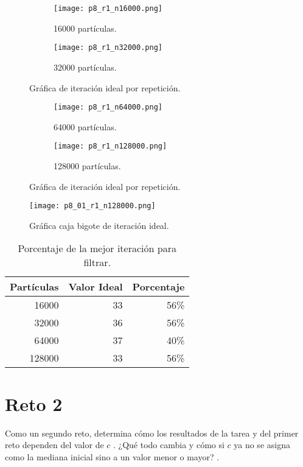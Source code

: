 \documentclass{article}
\begin{document}
\begin{figure}[H]
\centering
\begin{subfigure}[b]{0.40\linewidth}
\texttt{[image: p8\_r1\_n16000.png]}
\caption{16000 partículas.}
\end{subfigure}
\begin{subfigure}[b]{0.40\linewidth}
\texttt{[image: p8\_r1\_n32000.png]}
\caption{32000 partículas.}
\end{subfigure}
\caption{Gráfica de iteración ideal por repetición.}
\label{fig:westminster}
\end{figure}

\begin{figure}[H]
\centering
\begin{subfigure}[b]{0.40\linewidth}
\texttt{[image: p8\_r1\_n64000.png]}
\caption{64000 partículas.}
\end{subfigure}
\begin{subfigure}[b]{0.40\linewidth}
\texttt{[image: p8\_r1\_n128000.png]}
\caption{128000 partículas.}
\end{subfigure}
\caption{Gráfica de iteración ideal por repetición.}
\label{fig:westminster}
\end{figure}

\begin{figure}[H]
\centering
\texttt{[image: p8\_01\_r1\_n128000.png]}
\caption{\label{fig3} Gráfica caja bigote de iteración ideal.}
\end{figure}

\begin{table}[h!]
\centering
\caption{Porcentaje de la mejor iteración para filtrar.}
 \begin{tabular}{||r r r||} 
 \hline
 Partículas & Valor Ideal & Porcentaje  \\ [0.5ex] 
 \hline\hline
 16000 & 33 & 56\% \\
 \hline
 32000 & 36 & 56\%\\ 
 \hline
 64000 & 37 & 40\%  \\
 \hline
 128000 & 33 & 56\% \\
 \hline
\end{tabular}
\label{table:1}
\end{table}

\section{Reto 2}
Como un segundo reto, determina cómo los resultados de la tarea y del primer reto dependen del valor de $c$ . ¿Qué todo cambia y cómo si $c$ ya no se asigna como la mediana inicial sino a un valor menor o mayor? \cite{Satu_Elisa_Schaeffer}.
\end{document}

